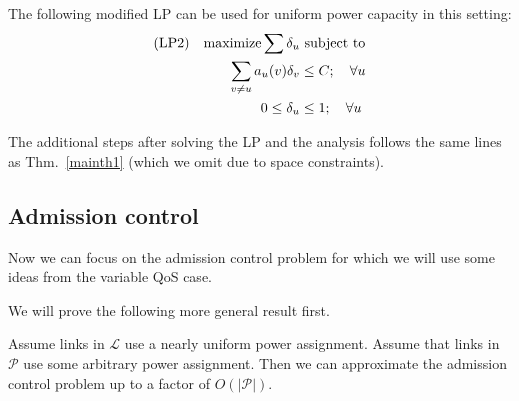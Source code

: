 \documentclass[11pt]{amsart}
\def\calL{{\mathcal L}}
\def\calP{{\mathcal P}}
\begin{document}
The following modified LP can be used for uniform power capacity in this setting:
\begin{align}
\text{(LP2)\quad maximize} \sum \delta_u &  \text{ subject to} \nonumber\\
\sum_{v \neq u} a_u(v) \delta_v & \leq C; \quad \forall u \\
0 \leq \delta_u & \leq 1; \quad \forall u  \nonumber
\end{align}

The additional steps after solving the LP and the analysis follows the same lines as Thm.~\ref{mainth1} (which we omit due to space constraints).


\subsection*{Admission control}

Now we can focus on the admission control problem for which we will use some ideas
from the variable QoS case.

We will prove the following more general result first.
\begin{theorem}
Assume links in $\calL$ use a nearly uniform power assignment. Assume that links in $\calP$ use some
arbitrary power assignment. Then we can approximate the admission control problem up to a  factor of $O(|\calP|)$.
\label{admingen1}
\end{theorem}
\end{document}
